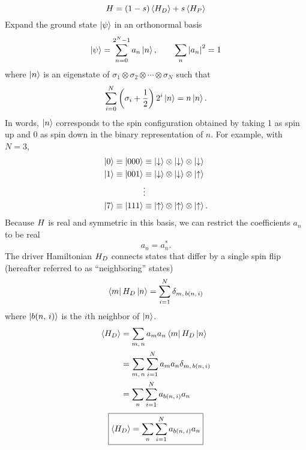 \begin{equation}
  H = (1 - s) \left< H_D \right> + s \left< H_P \right>
  \label{}
\end{equation}
Expand the ground state $\left| \psi \right>$ in an orthonormal basis
\begin{equation}
  \left| \psi \right> = \sum_{n=0}^{2^N-1} a_n \left| n \right>,
  \qquad
  \sum_n \left| a_n \right|^2 = 1
  \label{}
\end{equation}
where $\left| n \right>$ is an eigenstate of
$\sigma_1 \otimes \sigma_2 \otimes \cdots \otimes \sigma_N$
such that
\begin{equation}
    \sum_{i=0}^N \left( \sigma_i + \frac{1}{2} \right) 2^i \left| n \right> = n \left| n \right>.
  \label{}
\end{equation}
In words, $\left| n \right>$ corresponds to the spin configuration obtained by taking 1
as spin up and 0 as spin down in the binary representation of $n$.
For example, with $N=3$,
\begin{align*}
  \left| 0 \right> \equiv \left| 000 \right>
  &\equiv
  \left| \downarrow \right> \otimes
  \left| \downarrow \right> \otimes
  \left| \downarrow \right> \\
  \left| 1 \right> \equiv \left| 001 \right>
  &\equiv
  \left| \downarrow \right> \otimes
  \left| \downarrow \right> \otimes
  \left| \uparrow \right> \\
  &\vdots \\
  \left| 7 \right> \equiv \left| 111 \right>
  &\equiv
  \left| \uparrow \right> \otimes
  \left| \uparrow \right> \otimes
  \left| \uparrow \right>.
  \label{}
\end{align*}
Because $H$ is real and symmetric in this basis, we can restrict the
coefficients $a_n$ to be real
\begin{equation}
  a_n = a_n^*.
  \label{}
\end{equation}
The driver Hamiltonian $H_D$ connects states that differ by a single spin
flip (hereafter referred to as ``neighboring'' states)
\begin{equation}
  \matrixel{m}{H_D}{n} = \sum_{i=1}^N \delta_{m,\, \nghbr{n}{i}}
  \label{}
\end{equation}
where $\left| b(n,\,i) \right>$ is the $i$th neighbor of $\left| n \right>$.
\begin{align}
  \avg{\ham_D}
  &= \sum_{m,\,n} a_m a_n \matrixel{m}{\ham_D}{n} \\
  &= \sum_{m,\,n} \sum_{i=1}^N a_m a_n \delta_{m,\, \nghbr{n}{i}} \\
  &= \sum_n \sum_{i=1}^N a_{\nghbr{n}{i}} a_n
  \label{}
\end{align}
\begin{equation}
  \boxed{
  \left< H_D \right> = \sum_n \sum_{i=1}^N a_{b(n,\,i)} a_n
  }
  \label{}
\end{equation}
